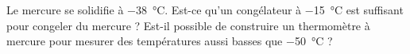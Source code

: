 
\begin{exercice}\label{exo2smath-0053}

    Le mercure se solidifie à \SI{-38}{\celsius}. Est-ce qu'un congélateur à \SI{-15}{\celsius} est suffisant pour congeler du mercure ? Est-il possible de construire un thermomètre à mercure pour mesurer des températures aussi basses que \SI{-50}{\celsius} ?

\end{exercice}
